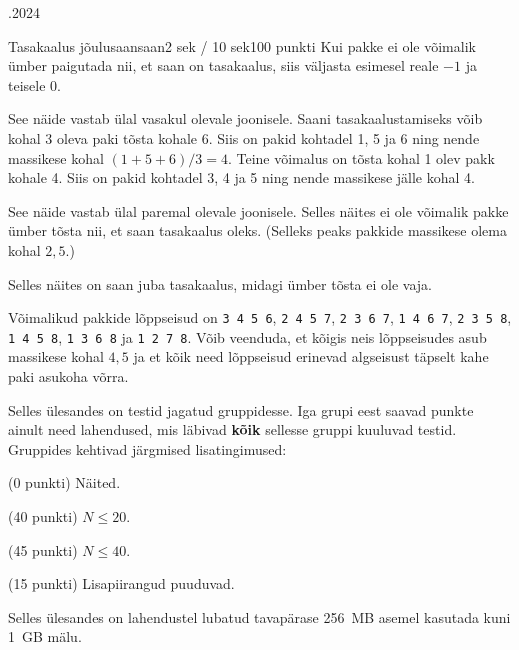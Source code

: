 \documentclass[a4paper,11pt]{article}
\begin{document}
\begin{ol}{\eio}{.2024}{\yle}{}
\begin{yl}{6}{Tasakaalus jõulusaan}{saan}{2 sek / 10 sek}{100 punkti}
    Kui pakke ei ole võimalik ümber paigutada nii, et saan on tasakaalus, siis väljasta esimesel reale $-1$
    ja teisele $0$.

    \nde[0]{5cm}{3cm}

    See näide vastab ülal vasakul olevale joonisele.
    Saani tasakaalustamiseks võib kohal 3 oleva paki tõsta kohale 6.
    Siis on pakid kohtadel 1, 5 ja 6 ning nende massikese kohal $(1 + 5 + 6) / 3 = 4$.
    Teine võimalus on tõsta kohal 1 olev pakk kohale 4. Siis on pakid kohtadel 3, 4 ja 5
    ning nende massikese jälle kohal 4.

    \nde[1]{5cm}{3cm}

    See näide vastab ülal paremal olevale joonisele.
    Selles näites ei ole võimalik pakke ümber tõsta nii, et saan tasakaalus oleks.
    (Selleks peaks pakkide massikese olema kohal $2,5$.)

    \nde[2]{5cm}{3cm}

    Selles näites on saan juba tasakaalus, midagi ümber tõsta ei ole vaja. 

    \nde[3]{5cm}{3cm}

    Võimalikud pakkide lõppseisud on \verb/3 4 5 6/, \verb/2 4 5 7/, \verb/2 3 6 7/, \verb/1 4 6 7/,
    \verb/2 3 5 8/, \verb/1 4 5 8/, \verb/1 3 6 8/ ja \verb/1 2 7 8/. Võib veenduda, et kõigis neis
    lõppseisudes asub massikese kohal $4,5$ ja et kõik need lõppseisud erinevad algseisust täpselt kahe
    paki asukoha võrra.

    \nde[4]{5cm}{3cm}

    \nde[5]{5cm}{3cm}

    \nde[6]{5cm}{3cm}

    \nde[7]{5cm}{3cm}

    \hnd Selles ülesandes on testid jagatud gruppidesse. Iga grupi eest saavad punkte
    ainult need lahendused, mis läbivad \textbf{kõik} sellesse gruppi kuuluvad
    testid. Gruppides kehtivad järgmised lisatingimused:

    \begin{xenum}
    \item (0 punkti) Näited.
    \item (40 punkti) $N \le 20$.
    \item (45 punkti) $N \le 40$.
    \item (15 punkti) Lisapiirangud puuduvad.
    \end{xenum}

    Selles ülesandes on lahendustel lubatud tavapärase 256~MB asemel kasutada kuni 1~GB mälu.
  \end{yl}
\end{ol}
\end{document}
